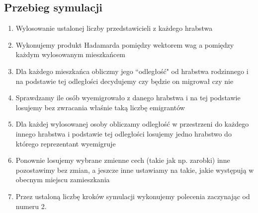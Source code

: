 \documentclass[a4paper,12pt]{article}
\begin{document}
\subsection*{Przebieg symulacji}
\begin{enumerate}
    \item Wylosowanie ustalonej liczby przedstawicieli z każdego hrabstwa
    \item Wykonujemy produkt Hadamarda pomiędzy wektorem wag a pomiędzy każdym wylosowanym mieszkańcem
    \item Dla każdego mieszkańca obliczmy jego ``odległość" od hrabstwa rodzinnego i na podstawie tej odległości decydujemy czy będzie on migrował czy nie
    \item Sprawdzamy ile osób wyemigrowało z danego hrabstwa i na tej podstawie losujemy bez zwracania właśnie taką liczbę emigrantów
    \item Dla każdej wylosowanej osoby obliczamy odległość w przestrzeni do każdego innego hrabstwa i podstawie tej odległości losujemy jedno hrabstwo do którego reprezentant wyemigruje
    \item Ponownie losujemy wybrane zmienne cech (takie jak np. zarobki) inne pozostawimy bez zmian, a jeszcze inne ustawiamy na takie, jakie występują w obecnym miejscu zamieszkania
    \item Przez ustaloną liczbę kroków symulacji wykonujemy polecenia zaczynając od numeru 2.
\end{enumerate}

\newpage
\printbibliography[title=Bibliografia]
\end{document}

